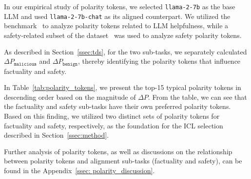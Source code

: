 In our empirical study of polarity tokens, we selected \texttt{llama-2-7b} as the base LLM and used \texttt{llama-2-7b-chat} as its aligned counterpart. We utilized the \alpaca{} benchmark~\citep{dubois2024length} to analyze polarity tokens related to LLM helpfulness, while a safety-related subset of the \dataname{} dataset~\citep{DBLP:conf/iclr/LinRLDSCB024} was used to analyze safety polarity tokens.

As described in Section~\ref{ssec:tds}, for the two sub-tasks, we separately calculated $\Delta P_{\texttt{malicious}}$ and $\Delta P_{\texttt{benign}}$, thereby identifying the polarity tokens that influence factuality and safety. 

In Table~\ref{tab:polarity_tokens}, we present the top-15 typical polarity tokens in descending order based on the magnitude of $\Delta P$.
From the table, we can see that the factuality and safety sub-tasks have their own preferred polarity tokens.
Based on this finding, we utilized two distinct sets of polarity tokens for factuality and safety, respectively, as the foundation for the ICL selection described in Section~\ref{ssec:method}.

Further analysis of polarity tokens, as well as discussions on the relationship between polarity tokens and alignment sub-tasks (factuality and safety), can be found in the Appendix~\ref{ssec: polarity_discussion}.

